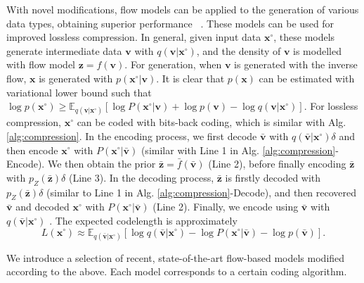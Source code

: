 \documentclass{article}
\newcommand{\quant}[1]{\bar{#1}}
\newcommand{\qv}[1]{\bar{\mathbf{#1}}}
\begin{document}
With novel modifications, flow models can be applied to the generation of various data types, obtaining superior performance ~\cite{chen2020vflow,lippe2020categorical,kim2020softflow}. These models can be used for improved lossless compression. In general, given input data $\mathbf{x}^\circ$, these models generate intermediate data $\mathbf{v}$ with $q(\mathbf{v} | \mathbf{x}^\circ)$, and the density of $\mathbf{v}$ is modelled with flow model $\mathbf{z} = f(\mathbf{v})$. For generation, when $\mathbf{v}$ is generated with the inverse flow, $\mathbf{x}$ is generated with $p(\mathbf{x}^\circ | \mathbf{v})$. It is clear that $p(\mathbf{x})$ can be estimated with variational lower bound such that $\log p(\mathbf{x}^\circ) \ge \mathbb{E}_{q(\mathbf{v} | \mathbf{x}^\circ)} [\log P(\mathbf{x}^\circ | \mathbf{v}) + \log p(\mathbf{v}) - \log q(\mathbf{v} | \mathbf{x}^\circ) ]$. For lossless compression, $\mathbf{x}^\circ$ can be coded with bits-back coding, which is similar with Alg. \ref{alg:compression}. In the encoding process, we first decode $\qv{v}$ with $ q(\qv{v} | \mathbf{x}^\circ) \delta$ and then encode $\mathbf{x}^\circ$ with $P(\mathbf{x}^\circ | \qv{v})$ (similar with Line 1 in Alg. \ref{alg:compression}-Encode). We then obtain the prior $\qv{z} = \quant{f} (\qv{v})$ (Line 2), before finally encoding $\qv{z}$ with $p_Z (\qv{z}) \delta$ (Line 3). In the decoding process, $\qv{z}$ is firstly decoded with $p_Z (\qv{z}) \delta$ (similar to Line 1 in Alg. \ref{alg:compression}-Decode), and then recovered $\qv{v}$ and decoded $\mathbf{x}^\circ$ with $P(\mathbf{x}^\circ | \qv{v})$ (Line 2). Finally, we encode using $\qv{v}$ with $ q(\qv{v} | \mathbf{x}^\circ)$ \cite{townsend2019practical}. The expected codelength is approximately
\begin{equation}
L(\mathbf{x}^\circ) \approx \mathbb{E}_{q(\qv{v} | \mathbf{x}^\circ)} [\log q(\qv{v} | \mathbf{x}^\circ) - \log P(\mathbf{x}^\circ | \qv{v}) - \log p(\qv{v})].
\end{equation}

We introduce a selection of recent, state-of-the-art flow-based models modified according to the above. Each model corresponds to a certain coding algorithm.
\end{document}
